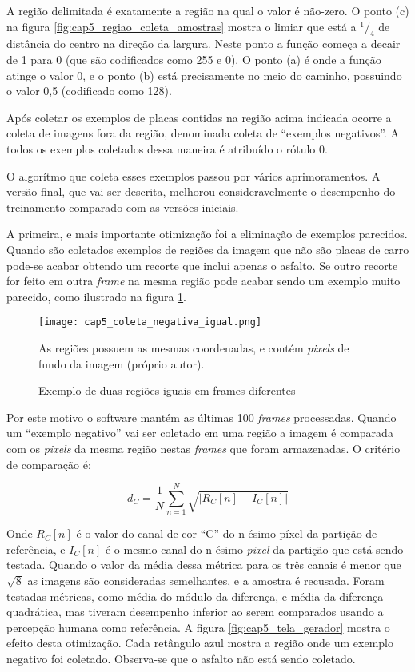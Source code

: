 A região delimitada é exatamente a região na qual o valor é não-zero. O ponto
(c) na figura \ref{fig:cap5_regiao_coleta_amostras} mostra o limiar que está
a $^1/_4$ de distância do centro na direção da largura. Neste ponto a função
começa a decair de 1 para 0 (que são codificados como 255 e 0). O ponto (a)
é onde a função atinge o valor 0, e o ponto (b) está precisamente no
meio do caminho, possuindo o valor 0,5 (codificado como 128).

Após coletar os exemplos de placas contidas na região acima indicada ocorre a
coleta de imagens fora da região, denominada coleta de “exemplos negativos”. A
todos os exemplos coletados dessa maneira é atribuído o rótulo 0.

O algorítmo que coleta esses exemplos passou por vários aprimoramentos. A
versão final, que vai ser descrita, melhorou consideravelmente o desempenho do
treinamento comparado com as versões iniciais.

A primeira, e mais importante otimização foi a eliminação de exemplos
parecidos. Quando são coletados exemplos de regiões da imagem que não são
placas de carro pode-se acabar obtendo um recorte que inclui apenas o asfalto.
Se outro recorte for feito em outra \emph{frame} na mesma região pode acabar
sendo um exemplo muito parecido, como ilustrado na figura
\ref{fig:cap5_coleta_negativa_igual}.

\begin{figure}[!htb]
	\centering
	\texttt{[image: cap5\_coleta\_negativa\_igual.png]}
	\caption{Exemplo de duas regiões iguais em frames diferentes}
	\label{fig:cap5_coleta_negativa_igual}
	As regiões possuem as mesmas coordenadas, e contém \emph{pixels} de fundo
	da imagem (próprio autor).
\end{figure}

Por este motivo o software mantém as últimas 100 \emph{frames} processadas.
Quando um “exemplo negativo” vai ser coletado em uma região a imagem é
comparada com os \emph{pixels} da mesma região nestas \emph{frames} que foram
armazenadas. O critério de comparação é:

\begin{equation}
	d_C=\frac{1}{N} \sum_{n=1}^N \sqrt{\left| R_C [n] -I_C [n] \right|}
\end{equation}

Onde $R_C[n]$ é o valor do canal de cor “C” do n-ésimo píxel da partição de
referência, e $I_C[n]$ é o mesmo canal do n-ésimo \emph{pixel} da
partição que está sendo testada. Quando o valor da média dessa métrica
para os três canais é menor que $\sqrt{8}$ as imagens são consideradas
semelhantes, e a amostra é recusada. Foram
testadas métricas, como média do módulo da diferença, e média da diferença
quadrática, mas tiveram desempenho inferior ao serem comparados usando a
percepção humana como referência. A figura
\ref{fig:cap5_tela_gerador} mostra o efeito desta otimização.
Cada retângulo azul mostra a região onde um exemplo negativo foi coletado.
Observa-se que o asfalto não está sendo coletado.


